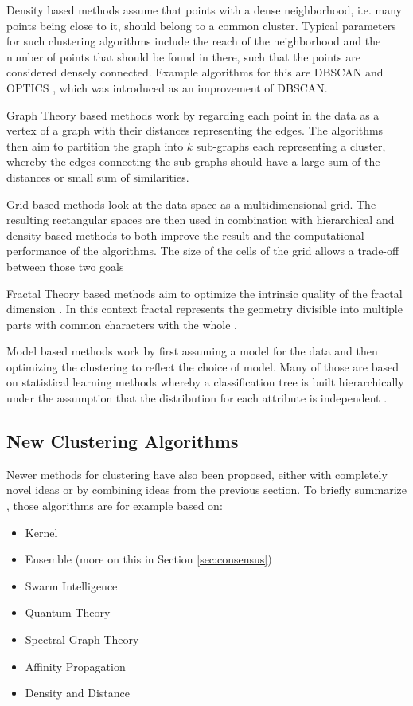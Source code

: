 \documentclass[
	a4paper,
	english,
	twoside,
	openright,               
	11pt                            
	]{report}
\begin{document}
Density based methods assume that points with a dense neighborhood, i.e. many points being close to it, should belong to a common cluster. Typical parameters for such clustering algorithms include the reach of the neighborhood and the number of points that should be found in there, such that the points are considered densely connected. Example algorithms for this are DBSCAN \cite{10.5555/3001460.3001507} and OPTICS \cite{10.1145/304181.304187}, which was introduced as an improvement of DBSCAN.

Graph Theory based methods work by regarding each point in the data as a vertex of a graph with their distances representing the edges. The algorithms then aim to partition the graph into $k$ sub-graphs each representing a cluster, whereby the edges connecting the sub-graphs should have a large sum of the distances or small sum of similarities.

Grid based methods look at the data space as a multidimensional grid. The resulting rectangular spaces are then used in combination with hierarchical and density based methods to both improve the result and the computational performance of the algorithms. The size of the cells of the grid allows a trade-off between those two goals

Fractal Theory based methods aim to optimize the intrinsic quality of the fractal dimension \cite{surveyclustering}. In this context fractal represents the geometry divisible into multiple parts with common characters with the whole \cite{surveyclustering}.

Model based methods work by first assuming a model for the data and then optimizing the clustering to reflect the choice of model. Many of those are based on statistical learning methods whereby a classification tree is built hierarchically under the assumption that the distribution for each attribute is independent \cite{surveyclustering}.

\subsection{New Clustering Algorithms}

Newer methods for clustering have also been proposed, either with completely novel ideas or by combining ideas from the previous section. To briefly summarize \cite{surveyclustering}, those algorithms are for example based on:

\begin{itemize}
  \item Kernel
  \item Ensemble (more on this in Section \ref{sec:consensus})
  \item Swarm Intelligence
  \item Quantum Theory
  \item Spectral Graph Theory
  \item Affinity Propagation
  \item Density and Distance
\end{itemize}
\end{document}
